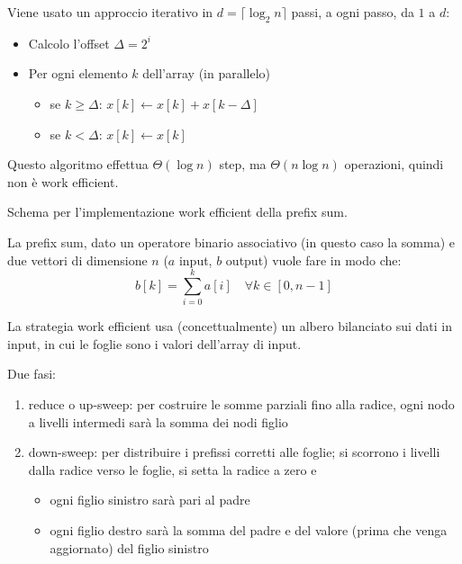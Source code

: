 \begin{questions}
\begin{solution}
        Viene usato un approccio iterativo in $d = \lceil \log_2 n \rceil$ passi, a ogni passo, da $1$ a $d$:
        \begin{itemize}
            \item Calcolo l'offset $\Delta = 2^i$
            
            \item Per ogni elemento $k$ dell'array (in parallelo)
            \begin{itemize}
                \item se $k \geq \Delta$: $x[k] \leftarrow x[k] + x[k - \Delta]$
                
                \item se $k < \Delta$: $x[k] \leftarrow x[k]$
            \end{itemize}
        \end{itemize}
        
        Questo algoritmo effettua $\Theta (\log n)$ step, ma $\Theta (n \log n)$ operazioni, quindi non è work efficient.
    \end{solution}
    
    \question Schema per l'implementazione work efficient della prefix sum.
    
    \begin{solution}
        La prefix sum, dato un operatore binario associativo (in questo caso la somma) e due vettori di dimensione $n$ ($a$ input, $b$ output) vuole fare in modo che:
        $$ b[k] = \sum_{i = 0}^{k} a[i] \quad \forall k \in [0,n-1] $$
        
        La strategia work efficient usa (concettualmente) un albero bilanciato sui dati in input, in cui le foglie sono i valori dell'array di input.
        
        Due fasi: 
        \begin{enumerate}
            \item reduce o up-sweep: per costruire le somme parziali fino alla radice, ogni nodo a livelli intermedi sarà la somma dei nodi figlio
            
            \item down-sweep: per distribuire i prefissi corretti alle foglie; si scorrono i livelli dalla radice verso le foglie, si setta la radice a zero e
            \begin{itemize}
                \item ogni figlio sinistro sarà pari al padre
                
                \item ogni figlio destro sarà la somma del padre e del valore (prima che venga aggiornato) del figlio sinistro
            \end{itemize}
        \end{enumerate}
        

\end{solution}
\end{questions}
